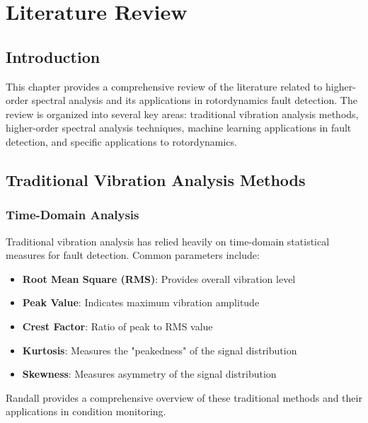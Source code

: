 
\chapter{Literature Review}

\section{Introduction}

This chapter provides a comprehensive review of the literature related to higher-order spectral analysis and its applications in rotordynamics fault detection. The review is organized into several key areas: traditional vibration analysis methods, higher-order spectral analysis techniques, machine learning applications in fault detection, and specific applications to rotordynamics.

\section{Traditional Vibration Analysis Methods}

\subsection{Time-Domain Analysis}

Traditional vibration analysis has relied heavily on time-domain statistical measures for fault detection. Common parameters include:

\begin{itemize}
    \item \textbf{Root Mean Square (RMS)}: Provides overall vibration level
    \item \textbf{Peak Value}: Indicates maximum vibration amplitude
    \item \textbf{Crest Factor}: Ratio of peak to RMS value
    \item \textbf{Kurtosis}: Measures the "peakedness" of the signal distribution
    \item \textbf{Skewness}: Measures asymmetry of the signal distribution
\end{itemize}

Randall \cite{randall2011vibration} provides a comprehensive overview of these traditional methods and their applications in condition monitoring.

